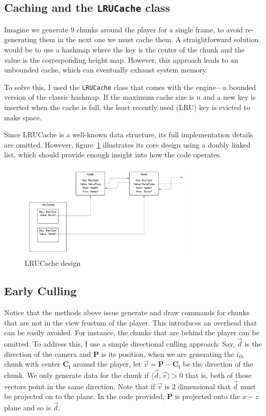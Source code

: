 \subsection{Caching and the \texttt{LRUCache} class}
Imagine we generate 9 chunks around the player for a single frame, to avoid re-generating them in the next one we must cache them. A straightforward solution would be to use a hashmap where the key is the center of the chunk and the value is the corresponding height map. However, this approach leads to an unbounded cache, which can eventually exhaust system memory.

To solve this, I used the \texttt{LRUCache} class that comes with the engine—a bounded version of the classic hashmap. If the maximum cache size is $n$ and a new key is inserted when the cache is full, the least recently used (LRU) key is evicted to make space.

Since LRUCache is a well-known data structure, its full implementation details are omitted. However, figure~\ref{fig:lru_cache} illustrates its core design using a doubly linked list, which should provide enough insight into how the code operates.

\begin{figure}[H]
    \centering
    \includegraphics[width=0.75\textwidth]{images/lru_cache.png}
    \caption{LRUCache design}
    \label{fig:lru_cache}
\end{figure}

\subsection{Early Culling}
Notice that the methods above issue generate and draw commands for chunks that are not in the view frustum of the player. This introduces an overhead that can be easily avoided. For instance, the chunks that are behind the player can be omitted. To address this, I use a simple directional culling approach: Say, $\vec{d}$ is the direction of the camera and $\mathbf{P}$ is its position, when we are generating the $i_{th}$ chunk with center $\mathbf{C_i}$ around the player, let $\vec{v} = \mathbf{P}-\mathbf{C_i}$ be the direction of the chunk. We only generate data for the chunk if $\langle \vec{d}, \vec{v} \rangle > 0$ that is, both of those vectors point in the same direction. Note that if $\vec{v}$ is 2 dimensional that $\vec{d}$ must be projected on to the plane. In the code provided, $\mathbf{P}$ is projected onto the $x-z$ plane and so is $\vec{d}$.

